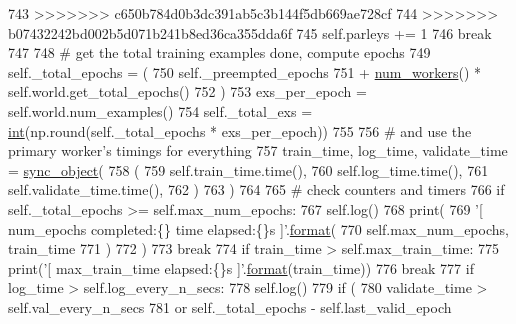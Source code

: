 \begin{DoxyCode}
743 >>>>>>> c650b784d0b3dc391ab5c3b144f5db669ae728cf
744 >>>>>>> b07432242bd002b5d071b241b8ed36ca355dda6f
745                 self.parleys += 1
746                 \textcolor{keywordflow}{break}
747 
748                 \textcolor{comment}{# get the total training examples done, compute epochs}
749                 self.\_total\_epochs = (
750                     self.\_preempted\_epochs
751                     + \hyperlink{namespaceparlai_1_1utils_1_1distributed_a99b61b4756577c6542039c238d670dba}{num\_workers}() * self.world.get\_total\_epochs()
752                 )
753                 exs\_per\_epoch = self.world.num\_examples()
754                 self.\_total\_exs = \hyperlink{namespacelanguage__model_1_1eval__ppl_a7d12ee00479673c5c8d1f6d01faa272a}{int}(np.round(self.\_total\_epochs * exs\_per\_epoch))
755 
756                 \textcolor{comment}{# and use the primary worker's timings for everything}
757                 train\_time, log\_time, validate\_time = \hyperlink{namespaceparlai_1_1utils_1_1distributed_a269d3c7284127d9b287b9b61e9161de6}{sync\_object}(
758                     (
759                         self.train\_time.time(),
760                         self.log\_time.time(),
761                         self.validate\_time.time(),
762                     )
763                 )
764 
765                 \textcolor{comment}{# check counters and timers}
766                 \textcolor{keywordflow}{if} self.\_total\_epochs >= self.max\_num\_epochs:
767                     self.log()
768                     print(
769                         \textcolor{stringliteral}{'[ num\_epochs completed:\{\} time elapsed:\{\}s ]'}.\hyperlink{namespaceparlai_1_1chat__service_1_1services_1_1messenger_1_1shared__utils_a32e2e2022b824fbaf80c747160b52a76}{format}(
770                             self.max\_num\_epochs, train\_time
771                         )
772                     )
773                     \textcolor{keywordflow}{break}
774                 \textcolor{keywordflow}{if} train\_time > self.max\_train\_time:
775                     print(\textcolor{stringliteral}{'[ max\_train\_time elapsed:\{\}s ]'}.\hyperlink{namespaceparlai_1_1chat__service_1_1services_1_1messenger_1_1shared__utils_a32e2e2022b824fbaf80c747160b52a76}{format}(train\_time))
776                     \textcolor{keywordflow}{break}
777                 \textcolor{keywordflow}{if} log\_time > self.log\_every\_n\_secs:
778                     self.log()
779                 \textcolor{keywordflow}{if} (
780                     validate\_time > self.val\_every\_n\_secs
781                     \textcolor{keywordflow}{or} self.\_total\_epochs - self.last\_valid\_epoch

\end{DoxyCode}
